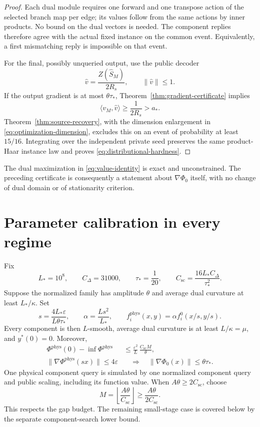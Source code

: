 \documentclass[11pt,letterpaper]{article}
\theoremstyle{definition}
\theoremstyle{remark}
\begin{document}
\begin{proof}
Each dual module requires one forward and one transpose action of the
selected branch map per edge; its values follow from the same actions by
inner products. No bound on the dual vectors is needed. The component
replies therefore agree with the actual fixed instance on the common
event. Equivalently, a first mismatching reply is impossible on that event.

For the final, possibly unqueried output, use the public decoder
\[
 \widehat v=\frac{Z(\widehat S_M)}{2R_s},\qquad\|\widehat v\|\le1.
\]
If the output gradient is at most $\theta\tau_*$,
Theorem~\ref{thm:gradient-certificate} implies
\[
 \langle v_M,\widehat v\rangle\ge\frac1{2R_s}>a_*.
\]
Theorem~\ref{thm:source-recovery}, with the dimension enlargement in
\eqref{eq:optimization-dimension}, excludes this on an event of probability
at least $15/16$. Integrating over the independent private seed preserves
the same product-Haar instance law and proves
\eqref{eq:distributional-hardness}.
\end{proof}

The dual maximization in \eqref{eq:value-identity} is exact and
unconstrained. The preceding certificate is consequently a statement about
$\nabla\Phi_0$ itself, with no change of dual domain or of stationarity
criterion.

\section{Parameter calibration in every regime}
\label{app:calibration}

Fix
\begin{equation}
 L_*=10^8,\qquad C_\Delta=31000,\qquad\tau_*=\frac1{20},
 \qquad C_{\mathrm{sc}}=\frac{16L_*C_\Delta}{\tau_*^2}.
 \label{eq:scaling-constant}
\end{equation}
Suppose the normalized family has amplitude $\theta$ and average dual
curvature at least $L_*/\kappa$. Set
\begin{equation}
 s=\frac{4L_*\varepsilon}{L\theta\tau_*},\qquad
 \alpha=\frac{Ls^2}{L_*},\qquad
 f_i^{\mathrm{phys}}(x,y)=\alpha f_i^0(x/s,y/s).
 \label{eq:physical-scaling}
\end{equation}
Every component is then $L$-smooth, average dual curvature is at least
$L/\kappa=\mu$, and $y^*(0)=0$. Moreover,
\begin{align}
 \Phi^{\mathrm{phys}}(0)-\inf\Phi^{\mathrm{phys}}
 &\le\frac{\varepsilon^2}{L}\,
              \frac{C_{\mathrm{sc}}M}{\theta},\label{eq:physical-gap}\\
 \|\nabla\Phi^{\mathrm{phys}}(sx)\|\le4\varepsilon
 &\quad\Longrightarrow\quad
 \|\nabla\Phi_0(x)\|\le\theta\tau_*.
 \label{eq:physical-gradient}
\end{align}
One physical component query is simulated by one normalized component query
and public scaling, including its function value. When
$A\theta\ge2C_{\mathrm{sc}}$, choose
\begin{equation}
 M=\left\lfloor\frac{A\theta}{C_{\mathrm{sc}}}\right\rfloor
 \ge\frac{A\theta}{2C_{\mathrm{sc}}}.
 \label{eq:stage-count}
\end{equation}
This respects the gap budget. The remaining small-stage case is covered
below by the separate component-search lower bound.
\end{document}
